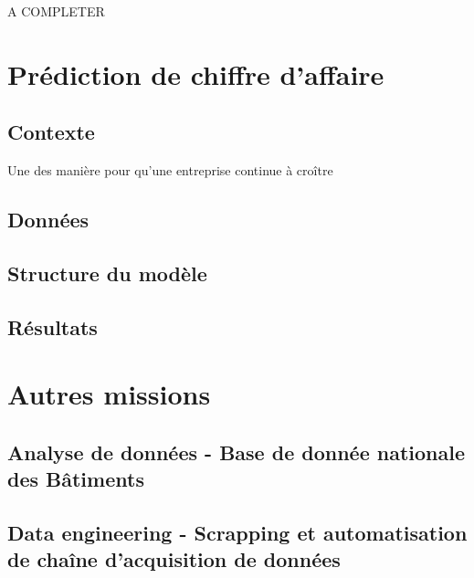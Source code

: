 A COMPLETER

\section{Prédiction de chiffre d'affaire}

\subsection{Contexte}

Une des manière pour qu'une entreprise continue à croître

\subsection{Données}

\subsection{Structure du modèle}

\subsection{Résultats}

\section{Autres missions}

\subsection{Analyse de données - Base de donnée nationale des Bâtiments}

\subsection{Data engineering - Scrapping et automatisation de chaîne d'acquisition de données}